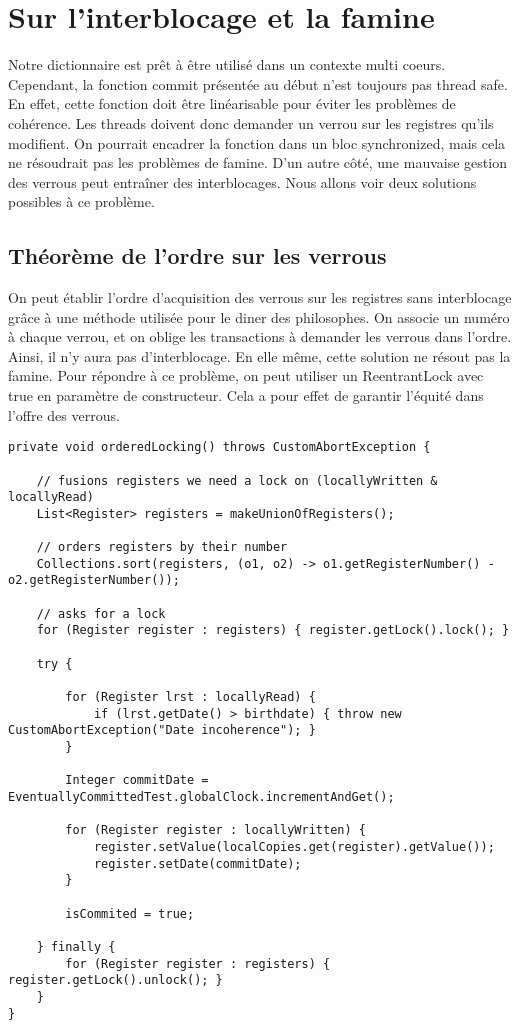 \documentclass[10pt, a4paper]{article}
\begin{document}
\section{Sur l'interblocage et la famine}
Notre dictionnaire est prêt à être utilisé dans un contexte multi coeurs. Cependant, la fonction commit présentée au début n'est toujours pas thread safe. En effet, cette fonction doit être linéarisable pour éviter les problèmes de cohérence. Les threads doivent donc demander un verrou sur les registres qu'ils modifient. On pourrait encadrer la fonction dans un bloc synchronized, mais cela ne résoudrait pas les problèmes de famine. D'un autre côté, une mauvaise gestion des verrous peut entraîner des interblocages. Nous allons voir deux solutions possibles à ce problème.

\subsection{Théorème de l'ordre sur les verrous}
On peut établir l'ordre d'acquisition des verrous sur les registres sans interblocage grâce à une méthode utilisée pour le diner des philosophes. On associe un numéro à chaque verrou, et on oblige les transactions à demander les verrous dans l'ordre. Ainsi, il n'y aura pas d'interblocage. En elle même, cette solution ne résout pas la famine. Pour répondre à ce problème, on peut utiliser un ReentrantLock avec true en paramètre de constructeur. Cela a pour effet de garantir l'équité dans l'offre des verrous.

\begin{lstlisting}
private void orderedLocking() throws CustomAbortException {

    // fusions registers we need a lock on (locallyWritten & locallyRead)
    List<Register> registers = makeUnionOfRegisters();

    // orders registers by their number
    Collections.sort(registers, (o1, o2) -> o1.getRegisterNumber() - o2.getRegisterNumber());

	// asks for a lock
    for (Register register : registers) { register.getLock().lock(); } 

    try {
    
        for (Register lrst : locallyRead) {
            if (lrst.getDate() > birthdate) { throw new CustomAbortException("Date incoherence"); }
        }
        
        Integer commitDate = EventuallyCommittedTest.globalClock.incrementAndGet();
        
        for (Register register : locallyWritten) {
            register.setValue(localCopies.get(register).getValue());
            register.setDate(commitDate);
        }
        
        isCommited = true;
        
    } finally {
		for (Register register : registers) { register.getLock().unlock(); }
    }
}
\end{lstlisting}
\end{document}
